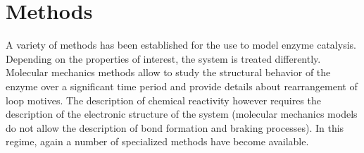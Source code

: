 \section{Methods}\label{sec:methods}
A variety of methods has been established for the use to model enzyme catalysis.
Depending on the properties of interest, the system is treated differently.
Molecular mechanics methods allow to study the structural behavior of the enzyme over a significant time period and provide details about rearrangement of loop motives.
The description of chemical reactivity however requires the description of the electronic structure of the system (molecular mechanics models do not allow the description of bond formation and braking processes).
In this regime, again a number of specialized methods have become available.

